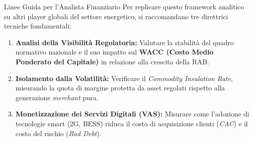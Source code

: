 \begin{frame}{Linee Guida per l'Analista Finanziario}
    Per replicare questo framework analitico su altri player globali del settore energetico, si raccomandano tre direttrici tecniche fondamentali:
    \vspace{0.2cm}

    \begin{enumerate}
        \item \textbf{Analisi della Visibilità Regolatoria:} Valutare la stabilità del quadro normativo nazionale e il suo impatto sul \textbf{WACC (Costo Medio Ponderato del Capitale)} in relazione alla crescita della RAB.
        \pause
        
        \item \textbf{Isolamento dalla Volatilità:} Verificare il \textit{Commodity Insulation Rate}, misurando la quota di margine protetta da asset regolati rispetto alla generazione \textit{merchant} pura.
        \pause
        
        \item \textbf{Monetizzazione dei Servizi Digitali (VAS):} Misurare come l'adozione di tecnologie smart (2G, BESS) riduca il costo di acquisizione clienti (\textit{CAC}) e il costo del rischio (\textit{Bad Debt}).
    \end{enumerate}
\end{frame}

